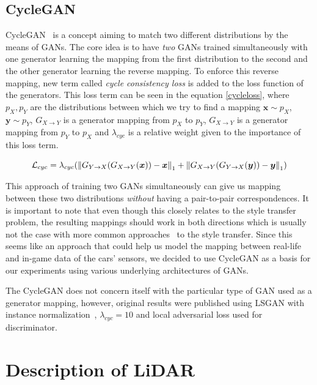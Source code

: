 \subsection{CycleGAN} \label{cyclegan}

CycleGAN~\cite{cyclegan} is a concept aiming to match two different distributions by the means of GANs. The core idea is to have {\em two} GANs trained simultaneously with one generator learning the mapping from the first distribution to the second and the other generator learning the reverse mapping. To enforce this reverse mapping, new term called {\em cycle consistency loss} is added to the loss function of the generators. This loss term can be seen in the equation \ref{cycleloss}, where $p_X, p_Y$ are the distributions between which we try to find a mapping $\bm{x}\sim p_X$, $\bm{y}\sim p_Y$, $G_{X\rightarrow Y}$ is a generator mapping from $p_X$ to $p_Y$, $G_{X\rightarrow Y}$ is a generator mapping from $p_Y$ to $p_X$ and $\lambda_{cyc}$ is a relative weight given to the importance of this loss term.

\begin{equation}
\mathcal{L}_{cyc} = \lambda_{cyc}(\left\lVert G_{Y\rightarrow X}(G_{X\rightarrow Y}(\bm{x})) - \bm{x}\right\rVert_1 + \left\lVert G_{X\rightarrow Y}(G_{Y\rightarrow X}(\bm{y})) - \bm{y}\right\rVert_1)
\label{cycleloss}
\end{equation}

This approach of training two GANs simultaneously can give us mapping between these two distributions {\em without} having a pair-to-pair correspondences. It is important to note that even though this closely relates to the style transfer problem, the resulting mappings should work in both directions which is usually not the case with more common approaches~\cite{artstyle} to the style transfer. Since this seems like an approach that could help us model the mapping between real-life and in-game data of the cars' sensors, we decided to use CycleGAN as a basis for our experiments using various underlying architectures of GANs.

The CycleGAN does not concern itself with the particular type of GAN used as a generator mapping, however, original results were published using LSGAN with instance normalization~\cite{instancenorm}, $\lambda_{cyc} = 10$ and local adversarial loss used for discriminator.

\section{Description of LiDAR}

